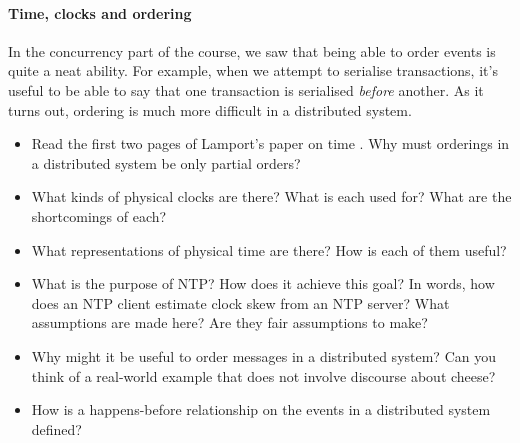 \documentclass[12pt,a4paper,oneside,openright]{report}
\newcommand{\question}[2]{\paragraph{#1} #2}
\begin{document}
\question{Time, clocks and ordering}{In the concurrency part of the
  course, we saw that being able to order events is quite a neat
  ability. For example, when we attempt to serialise transactions,
  it's useful to be able to say that one transaction is serialised
  \emph{before} another. As it turns out, ordering is much more
  difficult in a distributed system.
  \begin{itemize}
  \item Read the first two pages of Lamport's paper on time
    \cite{lamport1978time}. Why must orderings in a distributed system
    be only partial orders?
  \item What kinds of physical clocks are there? What is each used
    for? What are the shortcomings of each?
  \item What representations of physical time are there? How is each
    of them useful?
  \item What is the purpose of NTP? How does it achieve this goal? In
    words, how does an NTP client estimate clock skew from an NTP
    server? What assumptions are made here? Are they fair assumptions
    to make?
  \item Why might it be useful to order messages in a distributed
    system? Can you think of a real-world example that does not
    involve discourse about cheese?
  \item How is a happens-before relationship on the events in a
    distributed system defined?
  \end{itemize}
}
\end{document}
